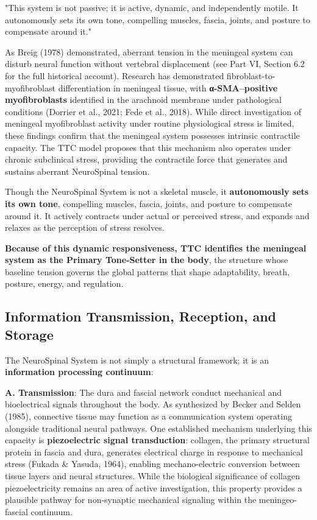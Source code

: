 \documentclass[11pt,letterpaper]{article}
\begin{document}
\begin{pullquotebox}
"This system is not passive; it is active, dynamic, and independently motile. It autonomously sets its own tone, compelling muscles, fascia, joints, and posture to compensate around it."
\end{pullquotebox}

As Breig (1978) demonstrated, aberrant tension in the meningeal system can disturb neural function without vertebral displacement (see Part VI, Section 6.2 for the full historical account). Research has demonstrated fibroblast-to-myofibroblast differentiation in meningeal tissue, with \textbf{α-SMA–positive myofibroblasts} identified in the arachnoid membrane under pathological conditions (Dorrier et al., 2021; Fede et al., 2018). While direct investigation of meningeal myofibroblast activity under routine physiological stress is limited, these findings confirm that the meningeal system possesses intrinsic contractile capacity. The TTC model proposes that this mechanism also operates under chronic subclinical stress, providing the contractile force that generates and sustains aberrant NeuroSpinal tension.


Though the NeuroSpinal System is not a skeletal muscle, it \textbf{autonomously sets its own tone}, compelling muscles, fascia, joints, and posture to compensate around it. It actively contracts under actual or perceived stress, and expands and relaxes as the perception of stress resolves.


\textbf{Because of this dynamic responsiveness, TTC identifies the meningeal system as the Primary Tone-Setter in the body}, the structure whose baseline tension governs the global patterns that shape adaptability, breath, posture, energy, and regulation.


\subsection{Information Transmission, Reception, and Storage}

The NeuroSpinal System is not simply a structural framework; it is an \textbf{information processing continuum}:


\textbf{A. Transmission}: The dura and fascial network conduct mechanical and bioelectrical signals throughout the body. As synthesized by Becker and Selden (1985), connective tissue may function as a communication system operating alongside traditional neural pathways. One established mechanism underlying this capacity is \textbf{piezoelectric signal transduction}: collagen, the primary structural protein in fascia and dura, generates electrical charge in response to mechanical stress (Fukada \& Yasuda, 1964), enabling mechano-electric conversion between tissue layers and neural structures. While the biological significance of collagen piezoelectricity remains an area of active investigation, this property provides a plausible pathway for non-synaptic mechanical signaling within the meningeo-fascial continuum.
\end{document}
